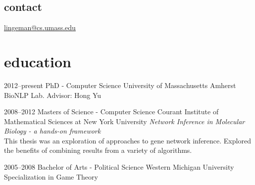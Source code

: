 \documentclass[]{friggeri-cv} %
\begin{document}


\begin{aside} %
\section{contact}
\href{mailto:lingeman@cs.umass.edu}{lingeman@cs.umass.edu}
\end{aside}


\section{education}

\begin{entrylist}

\entry
{2012--present}
{PhD - Computer Science}
{University of Massachusetts Amherst}
{BioNLP Lab. Advisor: Hong Yu}

\entry
{2008--2012}
{Masters {\normalfont of Science} - Computer Science}
{Courant Institute of Mathematical Sciences at New York University}
{\emph{Network Inference in Molecular Biology - a hands-on framework} \\ This thesis was an exploration of approaches to gene network inference. Explored the benefits of combining results from a variety of algorithms.}


\entry
{2005--2008}
{Bachelor {\normalfont of Arts} - Political Science}
{Western Michigan University}
{Specialization in Game Theory}


\end{entrylist}
\end{document}
